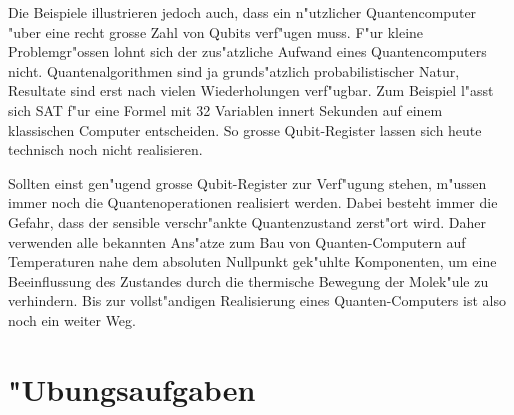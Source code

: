 Die Beispiele illustrieren jedoch auch, dass ein n"utzlicher
Quantencomputer "uber eine recht grosse Zahl von Qubits verf"ugen
muss.
F"ur kleine Problemgr"ossen lohnt sich der zus"atzliche Aufwand
eines Quantencomputers nicht.
Quantenalgorithmen sind ja grunds"atzlich probabilistischer
Natur, Resultate sind erst nach vielen Wiederholungen verf"ugbar.
Zum Beispiel l"asst sich SAT f"ur eine Formel mit 32 Variablen
innert Sekunden auf einem klassischen Computer entscheiden.
So grosse Qubit-Register lassen sich heute technisch noch nicht
realisieren.

Sollten einst gen"ugend grosse Qubit-Register zur Verf"ugung
stehen, m"ussen immer noch die Quantenoperationen realisiert
werden.
Dabei besteht immer die Gefahr, dass der sensible verschr"ankte
Quantenzustand zerst"ort wird.
Daher verwenden alle bekannten Ans"atze zum Bau von
Quanten-Computern auf Temperaturen nahe dem absoluten
Nullpunkt gek"uhlte Komponenten, um eine Beeinflussung des
Zustandes durch die thermische Bewegung der Molek"ule
zu verhindern.
Bis zur vollst"andigen Realisierung eines Quanten-Computers
ist also noch ein weiter Weg.

\section*{"Ubungsaufgaben}
\begin{uebungsaufgaben}
\item

\end{uebungsaufgaben}
